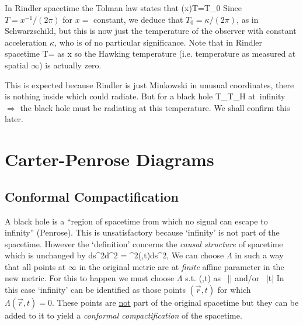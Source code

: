 In Rindler spacetime the Tolman law states that
\be
(\kappa x)T=T_0
\ee
Since $T=x^{-1}/(2\pi)$ for $x=$ constant, we deduce that 
$T_0=\kappa/(2\pi)$, as in Schwarzschild, but this is now just the temperature
of the observer with constant acceleration $\kappa$, who is of no particular
significance.  Note that in Rindler spacetime
\be
T=  \quad \mbox{as} \; x\to \infty
\ee
so the Hawking temperature (i.e. temperature as measured at spatial 
$\infty$) is actually zero. 

This is expected because Rindler is just Minkowski in unusual coordinates, there is nothing inside which could radiate.  But for a black hole
\be
T_{}\to T_H \quad \mbox{at infinity}
\ee
$\Rightarrow$ the black hole must be radiating at this temperature. We shall
confirm this later.

\section{Carter-Penrose Diagrams}

\subsection{Conformal Compactification}

A black hole is a ``region of spacetime from which no signal can escape to 
infinity'' (Penrose).  This is unsatisfactory because `infinity' is not part of
the spacetime.  However the `definition' concerns the \emph{causal structure} of
spacetime which is unchanged by 
\be
ds^2\to d^2 = \Lambda^2(,t)ds^2, \quad \Lambda{}
\ee
We can choose $\Lambda$ in such a way that all points at $\infty$ in the 
original metric are at \emph{finite} affine parameter in the new metric.  For
this to happen we must choose $\Lambda$ s.t.
\be
\Lambda(,t)  \quad \mbox{as } ||\to \infty \quad 
\mbox{and/or } |t|\to\infty
\ee
In this case `infinity' can be identified as those points $(\vec{r},t)$ for 
which $\Lambda(\vec{r},t)=0$.  These points are \ul{not} part of the original
spacetime but they can be added to it to yield a \emph{conformal
compactification} of the spacetime.

